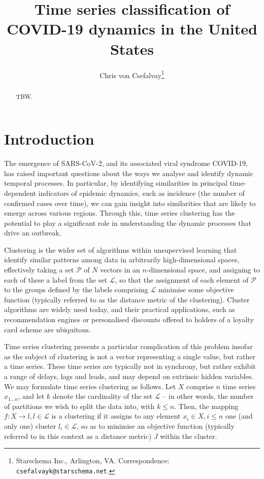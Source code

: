 \documentclass{article}
\title{Time series classification of COVID-19 dynamics in the United States}
\author{Chris von Csefalvay\thanks{Starschema Inc., Arlington, VA. Correspondence: \texttt{csefalvayk@starschema.net}.}}
\begin{document}
\maketitle

\begin{abstract}
    TBW.
\end{abstract}


\section{Introduction} %
\label{sec:introduction}

The emergence of SARS-CoV-2, and its associated viral syndrome COVID-19, has raised important questions about the ways we analyse and identify dynamic temporal processes. In particular, by identifying similarities in principal time-dependent indicators of epidemic dynamics, such as incidence (the number of confirmed cases over time), we can gain insight into similarities that are likely to emerge across various regions. Through this, time series clustering has the potential to play a significant role in understanding the dynamic processes that drive an outbreak.

Clustering is the wider set of algorithms within unsupervised learning that identify similar patterns among data in arbitrarily high-dimensional spaces, effectively taking a set $\mathcal{P}$ of $N$ vectors in an $n$-dimensional space, and assigning to each of these a label from the set $\mathcal{L}$, so that the assignment of each element of $\mathcal{P}$ to the groups defined by the labels comprising $\mathcal{L}$ minimise some objective function (typically referred to as the distance metric of the clustering). Cluster algorithms are widely used today, and their practical applications, such as recommendation engines or personalised discounts offered to holders of a loyalty card scheme are ubiquitous. 

Time series clustering presents a particular complication of this problem insofar as the subject of clustering is not a vector representing a single value, but rather a time series. These time series are typically not in synchrony, but rather exhibit a range of delays, lags and leads, and may depend on extrinsic hidden variables. We may formulate time series clustering as follows. Let $X$ comprise $n$ time series $x_{1 \ldots n}$, and let $k$ denote the cardinality of the set $\mathcal{L}$ -- in other words, the number of partitions we wish to split the data into, with $k \leq n$. Then, the mapping $f: X \rightarrow l, l \in \mathcal{L}$ is a clustering if it assigns to any element $x_i \in X, i \leq n$ one (and only one) cluster $l_i \in \mathcal{L}$, so as to minimise an objective function (typically referred to in this context as a distance metric) $J$ within the cluster.
\end{document}
